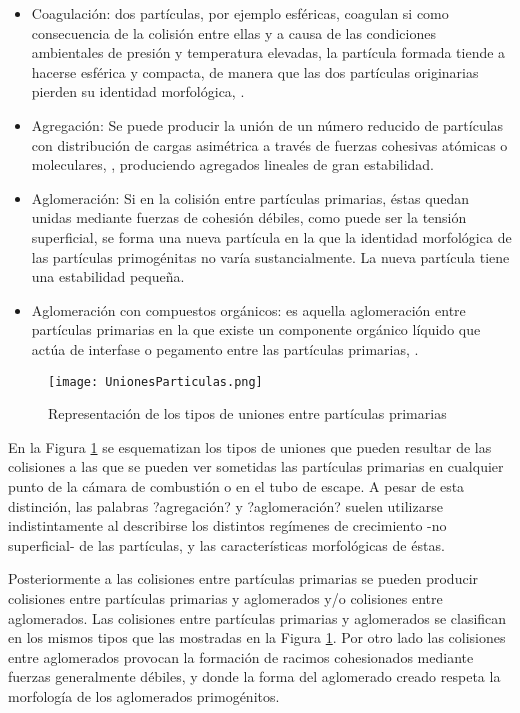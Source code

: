 \begin{itemize}

\item Coagulación: dos partículas, por ejemplo esféricas, coagulan si como consecuencia de la colisión entre ellas y a causa de las condiciones ambientales de presión y temperatura elevadas, la partícula formada tiende a hacerse esférica y compacta, de manera que las dos partículas originarias pierden su identidad morfológica, \cite{heywood:1988}.

\item Agregación: Se puede producir la unión de un número reducido de partículas con distribución de cargas asimétrica a través de fuerzas cohesivas atómicas o moleculares, \cite{heywood:1988}, produciendo agregados lineales de gran estabilidad.

\item Aglomeración: Si en la colisión entre partículas primarias, éstas quedan unidas mediante fuerzas de cohesión débiles, como puede ser la tensión superficial, se forma una nueva partícula en la que la identidad morfológica de las partículas primogénitas no varía sustancialmente. La nueva partícula tiene una estabilidad pequeña.

\item Aglomeración con compuestos orgánicos: es aquella aglomeración entre partículas primarias en la que existe un componente orgánico líquido que actúa de interfase o pegamento entre las partículas primarias, \cite{mikhailovetal:1996}.

\end{itemize}

\begin{figure}[ht]
\centering
	\texttt{[image: UnionesParticulas.png]}	 
	\caption{Representación de los tipos de uniones entre partículas primarias} \label{fig:unionesparticulas}
\end{figure} 

\par En la Figura \ref{fig:unionesparticulas} se esquematizan los tipos de uniones que pueden resultar de las colisiones a las que se pueden ver sometidas las partículas primarias en cualquier punto de la cámara de combustión o en el tubo de escape. A pesar de esta distinción, las palabras ?agregación? y ?aglomeración? suelen utilizarse indistintamente al describirse los distintos regímenes de crecimiento -no superficial- de las partículas, y las características morfológicas de éstas.

\par Posteriormente a las colisiones entre partículas primarias se pueden producir colisiones entre partículas primarias y aglomerados y/o colisiones entre aglomerados. Las colisiones entre partículas primarias y aglomerados se clasifican en los mismos tipos que las mostradas en la Figura \ref{fig:unionesparticulas}. Por otro lado las colisiones entre aglomerados provocan la formación de racimos cohesionados mediante fuerzas generalmente débiles, y donde la forma del aglomerado creado respeta la morfología de los aglomerados primogénitos.

